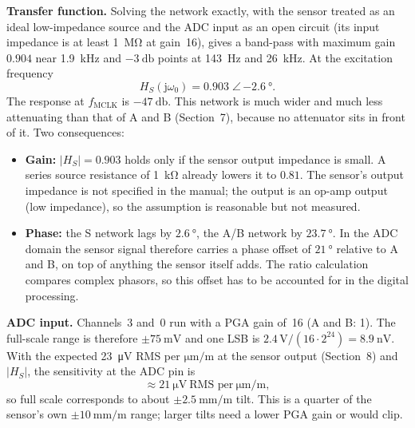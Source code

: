 \documentclass[11pt,a4paper]{article}
\begin{document}
\textbf{Transfer function.}  Solving the network exactly, with the sensor
treated as an ideal low-impedance source and the ADC input as an open
circuit (its input impedance is at least \SI{1}{\mega\ohm} at gain~16), gives
a band-pass with maximum gain $0.904$ near \SI{1.9}{\kilo\hertz} and
$\SI{-3}{\decibel}$ points at \SI{143}{\hertz} and \SI{26}{\kilo\hertz}.  At
the excitation frequency
\begin{equation}
  \boxed{H_S(\mathrm{j}\omega_0) = 0.903\;\angle\,\SI{-2.6}{\degree}.}
\end{equation}
The response at $f_{\mathrm{MCLK}}$ is $\SI{-47}{\decibel}$.  This network is
much wider and much less attenuating than that of A and B
(Section~7), because no attenuator sits in front of it.  Two consequences:
\begin{itemize}
  \item \textbf{Gain:} $|H_S|=0.903$ holds only if the sensor output
        impedance is small.  A series source resistance of \SI{1}{\kilo\ohm}
        already lowers it to $0.81$.  The sensor's output impedance is not
        specified in the manual; the output is an op-amp output (low
        impedance), so the assumption is reasonable but not measured.
  \item \textbf{Phase:} the S network lags by $\SI{2.6}{\degree}$, the A/B
        network by $\SI{23.7}{\degree}$.  In the ADC domain the sensor
        signal therefore carries a phase offset of
        $\SI{+21}{\degree}$ relative to A and B, on top of anything the
        sensor itself adds.  The ratio calculation compares complex
        phasors, so this offset has to be accounted for in the digital
        processing.
\end{itemize}

\textbf{ADC input.}  Channels~3 and~0 run with a PGA gain of~16 (A and B: 1).
The full-scale range is therefore $\pm\SI{75}{\milli\volt}$ and one LSB is
$2.4\,\mathrm{V}/(16\cdot 2^{24}) = \SI{8.9}{\nano\volt}$.  With the
expected \SI{23}{\micro\volt} RMS per $\si{\micro\metre\per\metre}$ at the
sensor output (Section~8) and $|H_S|$, the sensitivity at the ADC pin is
\begin{equation}
  \approx \SI{21}{\micro\volt}\ \text{RMS per}\ \si{\micro\metre\per\metre},
\end{equation}
so full scale corresponds to about $\pm\SI{2.5}{\milli\metre\per\metre}$
tilt.  This is a quarter of the sensor's own $\pm\SI{10}{\milli\metre\per\metre}$
range; larger tilts need a lower PGA gain or would clip.
\end{document}
